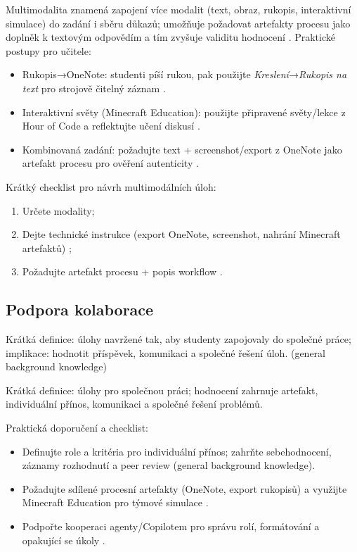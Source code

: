\documentclass{report}%
\begin{document}
%
Multimodalita znamená zapojení více modalit (text, obraz, rukopis, interaktivní simulace) do zadání i sběru důkazů; umožňuje požadovat artefakty procesu jako doplněk k textovým odpovědím a tím zvyšuje validitu hodnocení \cite{kb_ai_101_tipu_pdf_04e4a115_page_8_1}.
Praktické postupy pro učitele: \begin{itemize}
\item Rukopis→OneNote: studenti píší rukou, pak použijte \textit{Kreslení}→\textit{Rukopis na text} pro strojově čitelný záznam \cite{kb_ai_101_tipu_pdf_04e4a115_page_13_2}.
\item Interaktivní světy (Minecraft Education): použijte připravené světy/lekce z Hour of Code a reflektujte učení diskusí \cite{kb_ai_101_tipu_pdf_04e4a115_page_15_2}.
\item Kombinovaná zadání: požadujte text + screenshot/export z OneNote jako artefakt procesu pro ověření autenticity \cite{kb_ai_101_tipu_pdf_04e4a115_page_8_1, kb_ai_101_tipu_pdf_04e4a115_page_13_2}.
\end{itemize}
Krátký checklist pro návrh multimodálních úloh: \begin{enumerate}
\item Určete modality; \item Dejte technické instrukce (export OneNote, screenshot, nahrání Minecraft artefaktů) \cite{kb_ai_101_tipu_pdf_04e4a115_page_13_2, kb_ai_101_tipu_pdf_04e4a115_page_15_2}; \item Požadujte artefakt procesu + popis workflow \cite{kb_ai_101_tipu_pdf_04e4a115_page_8_1}.
\end{enumerate}%

%
\subsection{Podpora kolaborace}%
Krátká definice: úlohy navržené tak, aby studenty zapojovaly do společné práce; implikace: hodnotit příspěvek, komunikaci a společné řešení úloh. (general background knowledge)%


%
Krátká definice: úlohy pro společnou práci; hodnocení zahrnuje artefakt, individuální přínos, komunikaci a společné řešení problémů.

Praktická doporučení a checklist:
\begin{itemize}
  \item Definujte role a kritéria pro individuální přínos; zahrňte sebehodnocení, záznamy rozhodnutí a peer review (general background knowledge).
  \item Požadujte sdílené procesní artefakty (OneNote, export rukopisů) \cite{kb_ai_101_tipu_pdf_04e4a115_page_8_1} a využijte Minecraft Education pro týmové simulace \cite{kb_ai_101_tipu_pdf_04e4a115_page_15_2}.
  \item Podpořte kooperaci agenty/Copilotem pro správu rolí, formátování a opakující se úkoly \cite{kb_ai_101_tipu_pdf_04e4a115_page_31_1}.
\end{itemize}
\end{document}
